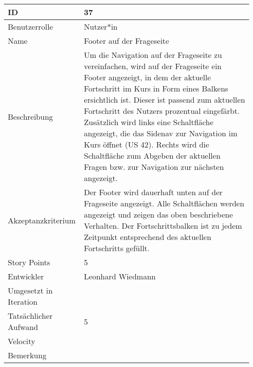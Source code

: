 \begin{tabularx}{\textwidth}{|p{}|X|}
	\hline
	ID & 37\\
	\hline
	Benutzerrolle & Nutzer*in\\
	\hline
	Name & Footer auf der Frageseite\\
	\hline
	Beschreibung & Um die Navigation auf der Frageseite zu vereinfachen, wird auf der Frageseite ein Footer angezeigt, in dem der aktuelle Fortschritt im Kurs in Form eines Balkens ersichtlich ist. Dieser ist passend zum aktuellen Fortschritt des Nutzers prozentual eingefärbt. Zusätzlich wird links eine Schaltfläche angezeigt, die das Sidenav zur Navigation im Kurs öffnet (US 42). Rechts wird die Schaltfläche zum Abgeben der aktuellen Fragen bzw. zur Navigation zur nächsten angezeigt.\\
	\hline
	Akzeptanzkriterium & Der Footer wird dauerhaft unten auf der Frageseite angezeigt. Alle Schaltflächen werden angezeigt und zeigen das oben beschriebene Verhalten. Der Fortschrittsbalken ist zu jedem Zeitpunkt entsprechend des aktuellen Fortschritts gefüllt.\\
	\hline
	Story Points & 5\\
	\hline
	Entwickler & Leonhard Wiedmann\\
	\hline
	Umgesetzt in Iteration & \\
	\hline
	Tatsächlicher Aufwand & 5 \\
	\hline
	Velocity & \\
	\hline
	Bemerkung & \\
	\hline
\end{tabularx}
\vspace{20pt}
